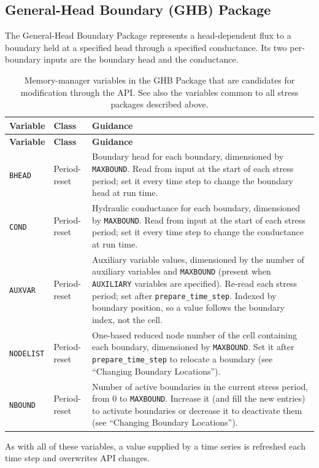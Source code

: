 \subsection{General-Head Boundary (GHB) Package}

The General-Head Boundary Package represents a head-dependent flux to a boundary
held at a specified head through a specified conductance. Its two per-boundary
inputs are the boundary head and the conductance.

\begin{longtable}{p{} p{} p{}}
\caption{Memory-manager variables in the GHB Package that are candidates for
modification through the API. See also the variables common to all stress
packages described above.} \label{table:api-gwf-ghb} \\

\hline
\textbf{Variable} & \textbf{Class} & \textbf{Guidance} \\
\hline
\endfirsthead

\hline
\textbf{Variable} & \textbf{Class} & \textbf{Guidance} \\
\hline
\endhead

\texttt{BHEAD} & Period-reset &
Boundary head for each boundary, dimensioned by \texttt{MAXBOUND}. Read from
input at the start of each stress period; set it every time step to change the
boundary head at run time. \\

\texttt{COND} & Period-reset &
Hydraulic conductance for each boundary, dimensioned by \texttt{MAXBOUND}. Read
from input at the start of each stress period; set it every time step to change
the conductance at run time. \\

\texttt{AUXVAR} & Period-reset &
Auxiliary variable values, dimensioned by the number of auxiliary variables and
\texttt{MAXBOUND} (present when \texttt{AUXILIARY} variables are specified).
Re-read each stress period; set after \texttt{prepare\_time\_step}. Indexed by
boundary position, so a value follows the boundary index, not the cell. \\

\texttt{NODELIST} & Period-reset &
One-based reduced node number of the cell containing each boundary, dimensioned
by \texttt{MAXBOUND}. Set it after \texttt{prepare\_time\_step} to relocate a
boundary (see ``Changing Boundary Locations''). \\

\texttt{NBOUND} & Period-reset &
Number of active boundaries in the current stress period, from 0 to
\texttt{MAXBOUND}. Increase it (and fill the new entries) to activate boundaries
or decrease it to deactivate them (see ``Changing Boundary Locations''). \\

\hline
\end{longtable}

\noindent As with all of these variables, a value supplied by a time series is
refreshed each time step and overwrites API changes.
